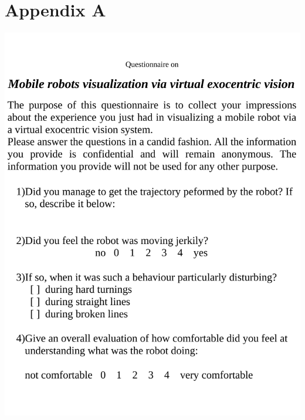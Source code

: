 \setcounter{figure}{0}
\setcounter{table}{0}
\setcounter{lstlisting}{0}

\section{Appendix A}
\label{sec:appendix_a}
\includegraphics[scale=0.6]{questionnaire.pdf}

